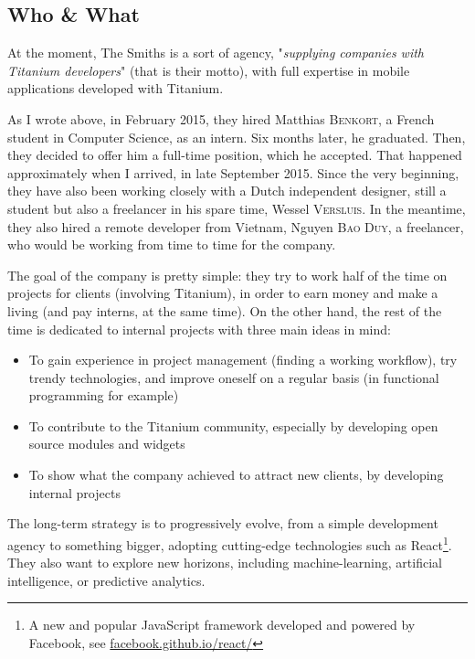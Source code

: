 \subsection{Who \& What}

At the moment, The Smiths is a sort of agency, "\textit{supplying companies with Titanium developers}" (that is their motto), with full expertise in mobile applications developed with Titanium.

\medskip

As I wrote above, in February 2015, they hired Matthias \textsc{Benkort}, a French student in Computer Science, as an intern. Six months later, he graduated. Then, they decided to offer him a full-time position, which he accepted. That happened approximately when I arrived, in late September 2015. Since the very beginning, they have also been working closely with a Dutch independent designer, still a student but also a freelancer in his spare time, Wessel \textsc{Versluis}. In the meantime, they also hired a remote developer from Vietnam, Nguyen \textsc{Bao Duy}, a freelancer, who would be working from time to time for the company.

\medskip

The goal of the company is pretty simple: they try to work half of the time on projects for clients (involving Titanium), in order to earn money and make a living (and pay interns, at the same time). On the other hand, the rest of the time is dedicated to internal projects with three main ideas in mind:

\begin{itemize}
  \item To gain experience in project management (finding a working workflow), try trendy technologies, and improve oneself on a regular basis (in functional programming for example)
  \item To contribute to the Titanium community, especially by developing open source modules and widgets
  \item To show what the company achieved to attract new clients, by developing internal projects
\end{itemize}

The long-term strategy is to progressively evolve, from a simple development agency to something bigger, adopting cutting-edge technologies such as React\footnote{A new and popular JavaScript framework developed and powered by Facebook, see \href{https://facebook.github.io/react/}{facebook.github.io/react/}}. They also want to explore new horizons, including machine-learning, artificial intelligence, or predictive analytics.

